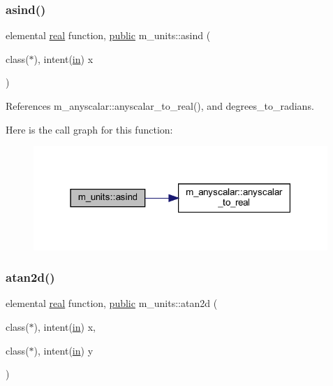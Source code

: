 \subsubsection{\texorpdfstring{asind()}{asind()}}
{\footnotesize\ttfamily elemental \hyperlink{read__watch_83_8txt_abdb62bde002f38ef75f810d3a905a823}{real} function, \hyperlink{M__stopwatch_83_8txt_a2f74811300c361e53b430611a7d1769f}{public} m\+\_\+units\+::asind (\begin{DoxyParamCaption}\item[{class($\ast$), intent(\hyperlink{M__journal_83_8txt_afce72651d1eed785a2132bee863b2f38}{in})}]{x }\end{DoxyParamCaption})}



References m\+\_\+anyscalar\+::anyscalar\+\_\+to\+\_\+real(), and degrees\+\_\+to\+\_\+radians.

Here is the call graph for this function\+:
\nopagebreak
\begin{figure}[H]
\begin{center}
\leavevmode
\includegraphics[width=316pt]{namespacem__units_ad2b3de1ae68e3090d6c5793fc50dce77_cgraph}
\end{center}
\end{figure}
\mbox{\label{namespacem__units_a09403aaa43be5c74f7b9a3c2df2d1460}} 
\subsubsection{\texorpdfstring{atan2d()}{atan2d()}}
{\footnotesize\ttfamily elemental \hyperlink{read__watch_83_8txt_abdb62bde002f38ef75f810d3a905a823}{real} function, \hyperlink{M__stopwatch_83_8txt_a2f74811300c361e53b430611a7d1769f}{public} m\+\_\+units\+::atan2d (\begin{DoxyParamCaption}\item[{class($\ast$), intent(\hyperlink{M__journal_83_8txt_afce72651d1eed785a2132bee863b2f38}{in})}]{x,  }\item[{class($\ast$), intent(\hyperlink{M__journal_83_8txt_afce72651d1eed785a2132bee863b2f38}{in})}]{y }\end{DoxyParamCaption})}



